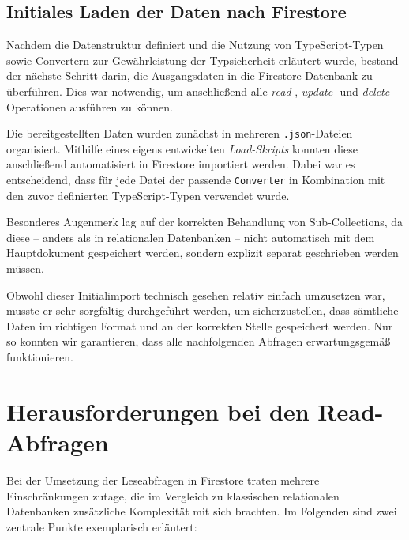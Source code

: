 \documentclass[12pt,a4paper%
              ,oneside     %
              ,titlepage
              ,DIV=13
              ,headinclude
              ,footinclude=false%
              ,cleardoublepage=empty%
              ,parskip=half,
              BCOR=0mm,
              ]{scrreprt}
\begin{document}
\section{Initiales Laden der Daten nach Firestore}

Nachdem die Datenstruktur definiert und die Nutzung von TypeScript-Typen sowie Convertern zur Gewährleistung der Typsicherheit erläutert wurde, bestand der nächste Schritt darin, die Ausgangsdaten in die Firestore-Datenbank zu überführen. Dies war notwendig, um anschließend alle \textit{read}-, \textit{update}- und \textit{delete}-Operationen ausführen zu können.

Die bereitgestellten Daten wurden zunächst in mehreren \texttt{.json}-Dateien organisiert. Mithilfe eines eigens entwickelten \textit{Load-Skripts} konnten diese anschließend automatisiert in Firestore importiert werden. Dabei war es entscheidend, dass für jede Datei der passende \texttt{Converter} in Kombination mit den zuvor definierten TypeScript-Typen verwendet wurde.

Besonderes Augenmerk lag auf der korrekten Behandlung von Sub-Collections, da diese – anders als in relationalen Datenbanken – nicht automatisch mit dem Hauptdokument gespeichert werden, sondern explizit separat geschrieben werden müssen.

Obwohl dieser Initialimport technisch gesehen relativ einfach umzusetzen war, musste er sehr sorgfältig durchgeführt werden, um sicherzustellen, dass sämtliche Daten im richtigen Format und an der korrekten Stelle gespeichert werden. Nur so konnten wir garantieren, dass alle nachfolgenden Abfragen erwartungsgemäß funktionieren.

\chapter{Herausforderungen bei den Read-Abfragen}

Bei der Umsetzung der Leseabfragen in Firestore traten mehrere Einschränkungen zutage, die im Vergleich zu klassischen relationalen Datenbanken zusätzliche Komplexität mit sich brachten. Im Folgenden sind zwei zentrale Punkte exemplarisch erläutert:
\end{document}
